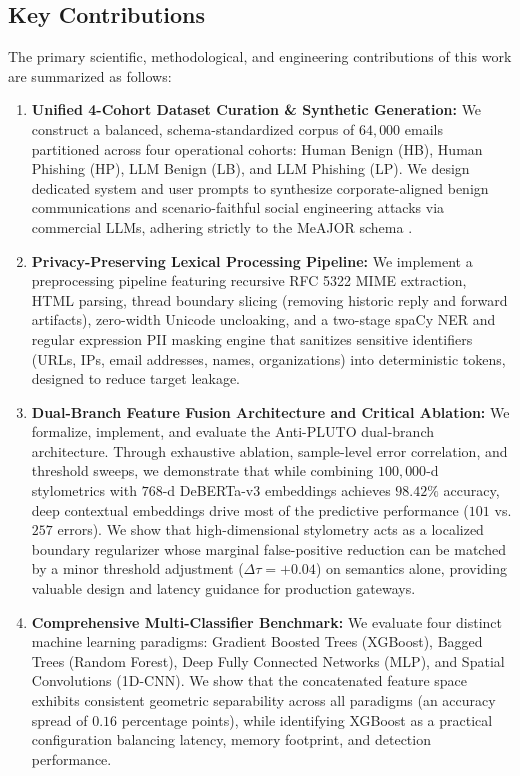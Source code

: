 \documentclass[journal]{IEEEtran}
\begin{document}
\subsection{Key Contributions}
The primary scientific, methodological, and engineering contributions of this work are summarized as follows:
\begin{enumerate}
    \item \textbf{Unified 4-Cohort Dataset Curation \& Synthetic Generation:} We construct a balanced, schema-standardized corpus of $64,000$ emails partitioned across four operational cohorts: Human Benign (HB), Human Phishing (HP), LLM Benign (LB), and LLM Phishing (LP). We design dedicated system and user prompts to synthesize corporate-aligned benign communications and scenario-faithful social engineering attacks via commercial LLMs, adhering strictly to the MeAJOR schema \cite{meajor2025corpus}.
    \item \textbf{Privacy-Preserving Lexical Processing Pipeline:} We implement a preprocessing pipeline featuring recursive RFC 5322 MIME extraction, HTML parsing, thread boundary slicing (removing historic reply and forward artifacts), zero-width Unicode uncloaking, and a two-stage spaCy NER and regular expression PII masking engine that sanitizes sensitive identifiers (URLs, IPs, email addresses, names, organizations) into deterministic tokens, designed to reduce target leakage.
    \item \textbf{Dual-Branch Feature Fusion Architecture and Critical Ablation:} We formalize, implement, and evaluate the Anti-PLUTO dual-branch architecture. Through exhaustive ablation, sample-level error correlation, and threshold sweeps, we demonstrate that while combining $100,000$-d stylometrics with $768$-d DeBERTa-v3 embeddings achieves $98.42\%$ accuracy, deep contextual embeddings drive most of the predictive performance ($101$ vs. $257$ errors). We show that high-dimensional stylometry acts as a localized boundary regularizer whose marginal false-positive reduction can be matched by a minor threshold adjustment ($\Delta \tau = +0.04$) on semantics alone, providing valuable design and latency guidance for production gateways.
    \item \textbf{Comprehensive Multi-Classifier Benchmark:} We evaluate four distinct machine learning paradigms: Gradient Boosted Trees (XGBoost), Bagged Trees (Random Forest), Deep Fully Connected Networks (MLP), and Spatial Convolutions (1D-CNN). We show that the concatenated feature space exhibits consistent geometric separability across all paradigms (an accuracy spread of $0.16$ percentage points), while identifying XGBoost as a practical configuration balancing latency, memory footprint, and detection performance.


\end{enumerate}
\end{document}
